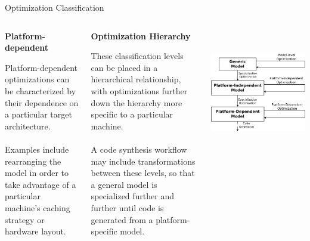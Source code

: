 \documentclass[final,hyperref={pdfpagelabels=false}]{beamer}
\begin{document}
\begin{frame}{}
\begin{block}{Optimization Classification}
\begin{columns}[t]
\begin{column}{.16\linewidth}
          \begin{center}\textbf{Platform-dependent}\end{center}
          \footnotesize
            Platform-dependent optimizations can be characterized by their dependence on a particular target
            architecture. \\~\\Examples include rearranging the model in order to take advantage of a particular machine's
            caching strategy or hardware layout.
            \end{column}
            \hspace{-1.2cm}\vrule\hspace{.05cm}
            \begin{column}{.18\linewidth}
          \begin{center}\textbf{Optimization Hierarchy}\end{center}
          \footnotesize
            These classification levels can be placed in a hierarchical relationship, with optimizations
            further down the hierarchy more specific to a particular machine. \\~\\A code synthesis workflow may include transformations between these levels, so that a general model is specialized further and further until code is generated from a platform-specific model.
            \end{column}
            
            \begin{column}{.20\linewidth}
          ~\\~\\
            \includegraphics[width=\textwidth]{images/hierarchy}
            \end{column}
                        

\end{columns}
\end{block}
\end{frame}
\end{document}
